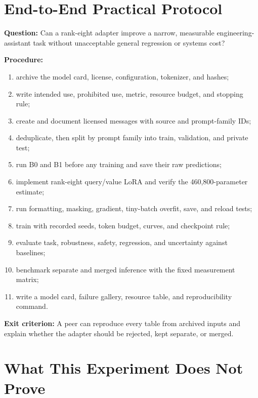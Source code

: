 \section{End-to-End Practical Protocol}

\begin{practicallab}
\textbf{Question:}
Can a rank-eight adapter improve a narrow, measurable engineering-assistant
task without unacceptable general regression or systems cost?

\textbf{Procedure:}
\begin{enumerate}
    \item archive the model card, license, configuration, tokenizer, and hashes;
    \item write intended use, prohibited use, metric, resource budget, and
          stopping rule;
    \item create and document licensed messages with source and prompt-family
          IDs;
    \item deduplicate, then split by prompt family into train, validation, and
          private test;
    \item run B0 and B1 before any training and save their raw predictions;
    \item implement rank-eight query/value LoRA and verify the
          460,800-parameter estimate;
    \item run formatting, masking, gradient, tiny-batch overfit, save, and
          reload tests;
    \item train with recorded seeds, token budget, curves, and checkpoint rule;
    \item evaluate task, robustness, safety, regression, and uncertainty
          against baselines;
    \item benchmark separate and merged inference with the fixed measurement
          matrix;
    \item write a model card, failure gallery, resource table, and
          reproducibility command.
\end{enumerate}

\textbf{Exit criterion:}
A peer can reproduce every table from archived inputs and explain whether the
adapter should be rejected, kept separate, or merged.
\end{practicallab}

\section{What This Experiment Does Not Prove}

